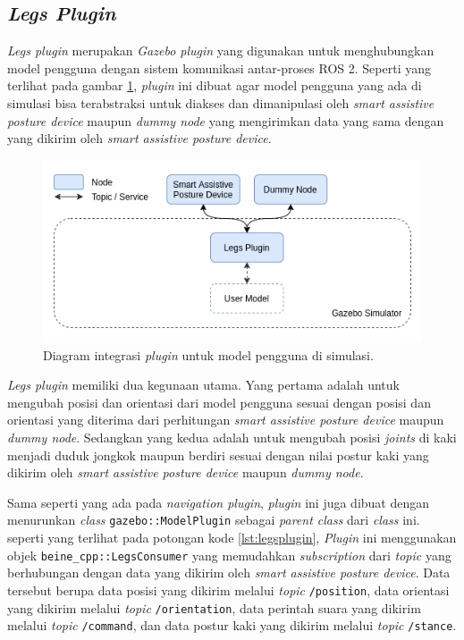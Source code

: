 \subsection{\emph{Legs Plugin}}
\label{subsec:legsplugin}

\emph{Legs plugin} merupakan \emph{Gazebo plugin} yang digunakan untuk menghubungkan model pengguna dengan sistem komunikasi antar-proses ROS 2.
Seperti yang terlihat pada gambar \ref{fig:integrasipluginpengguna},
  \emph{plugin} ini dibuat agar model pengguna yang ada di simulasi bisa terabstraksi untuk diakses dan dimanipulasi oleh \emph{smart assistive posture device} maupun \emph{dummy node} yang mengirimkan data yang sama dengan yang dikirim oleh \emph{smart assistive posture device}.

  \begin{figure}[ht]
    \centering
    \includegraphics[scale=0.5]{gambar/integrasi-plugin-pengguna.png}
    \caption{Diagram integrasi \emph{plugin} untuk model pengguna di simulasi.}
    \label{fig:integrasipluginpengguna}
  \end{figure}

\emph{Legs plugin} memiliki dua kegunaan utama.
Yang pertama adalah untuk mengubah posisi dan orientasi dari model pengguna sesuai dengan posisi dan orientasi yang diterima dari perhitungan \emph{smart assistive posture device} maupun \emph{dummy node}.
Sedangkan yang kedua adalah untuk mengubah posisi \emph{joints} di kaki menjadi duduk jongkok maupun berdiri sesuai dengan nilai postur kaki yang dikirim oleh \emph{smart assistive posture device} maupun \emph{dummy node}.



Sama seperti yang ada pada \emph{navigation plugin},
  \emph{plugin} ini juga dibuat dengan menurunkan \emph{class} \lstinline{gazebo::ModelPlugin} sebagai \emph{parent class} dari \emph{class} ini.
seperti yang terlihat pada potongan kode \ref{lst:legsplugin},
  \emph{Plugin} ini menggunakan objek \lstinline{beine_cpp::LegsConsumer} yang memudahkan \emph{subscription} dari \emph{topic} yang berhubungan dengan data yang dikirim oleh \emph{smart assistive posture device}.
Data tersebut berupa data posisi yang dikirim melalui \emph{topic} \lstinline{/position},
  data orientasi yang dikirim melalui \emph{topic} \lstinline{/orientation},
  data perintah suara yang dikirim melalui \emph{topic} \lstinline{/command},
  dan data postur kaki yang dikirim melalui \emph{topic} \lstinline{/stance}.

